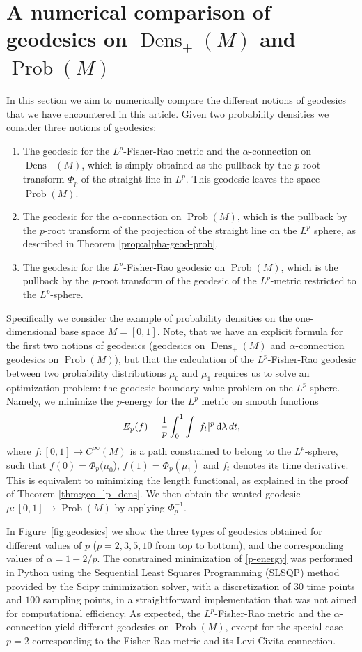 \documentclass[11pt]{amsart}
\theoremstyle{definition}
\newcommand{\dx}{\lambda}
\newcommand{\Prob}{\operatorname{Prob}(M)}
\newcommand{\Dens}{\operatorname{Dens}_+(M)}
\newcommand{\ud}{\textup{d}}
\begin{document}
\section{A numerical comparison of geodesics on $\Dens$ and $\Prob$}\label{sec:numerics}
In this section we aim to numerically compare the different notions of geodesics that we have encountered in this article. Given two probability densities 
we consider three notions of geodesics:
\begin{enumerate}
    \item The geodesic for the $L^p$-Fisher-Rao metric and the $\alpha$-connection on $\Dens$, which is simply obtained as the pullback by the $p$-root transform $\Phi_p$ of the straight line in $L^p$. This geodesic leaves the space $\Prob$.
    \item The geodesic for the $\alpha$-connection on $\Prob$, which is the pullback by the $p$-root transform of the projection of the straight line on the $L^p$ sphere, as described in Theorem \ref{prop:alpha-geod-prob}.
    \item The geodesic for the $L^p$-Fisher-Rao geodesic on $\Prob$, which is the pullback by the $p$-root transform of the geodesic of the $L^p$-metric restricted to the $L^p$-sphere.
\end{enumerate}
Specifically we consider the example of probability densities on the one-dimensional base space $M=[0,1]$. Note, that we have an explicit formula for the first two notions of geodesics (geodesics on $\Dens$ and $\alpha$-connection geodesics on $\Prob$), but that the calculation of the $L^p$-Fisher-Rao geodesic between two probability distributions $\mu_0$ and $\mu_1$ requires us to solve an optimization problem: the geodesic boundary value problem on the $L^p$-sphere. Namely, we minimize the $p$-energy for the $L^p$ metric on smooth functions
\begin{equation}\label{p-energy}
E_p(f)=\frac1p\int_0^1\int |f_t|^p\,\ud\dx\, dt,   
\end{equation}
where $f: [0,1]\to C^\infty(M)$ is a path constrained to belong to the $L^p$-sphere, such that $f(0)=\Phi_p(\mu_0$), $f(1)=\Phi_p(\mu_1)$ and $f_t$ denotes its time derivative. This is equivalent to minimizing the length functional, as explained in the proof of Theorem \ref{thm:geo_lp_dens}. We then obtain the wanted geodesic $\mu:[0,1]\rightarrow \Prob$ by applying $\Phi_p^{-1}$.
 
In Figure~\ref{fig:geodesics} we show the three types of geodesics obtained for different values of $p$ ($p=2,3,5, 10$ from top to bottom), and the corresponding values of $\alpha=1-2/p$. The constrained minimization of \eqref{p-energy} was performed in Python using the Sequential Least Squares Programming (SLSQP) method provided by the Scipy minimization solver, with a discretization of $30$ time points and $100$ sampling points, in a straightforward implementation that was not aimed for computational efficiency. As expected, the $L^p$-Fisher-Rao metric and the $\alpha$-connection yield different geodesics on $\Prob$, except for the special case $p=2$ corresponding to the Fisher-Rao metric and its Levi-Civita connection.
\end{document}
